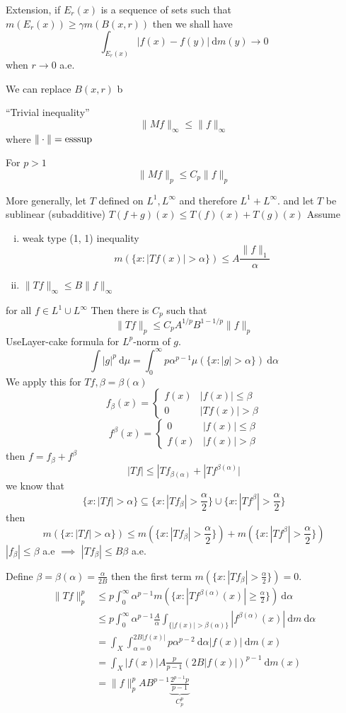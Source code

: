 Extension, if $E_r(x)$ is a sequence of sets such that
$m(E_r(x)) \ge \gamma m(B(x, r))$
then we shall have 
\[\int_{E_r(x)} |f(x) - f(y)| \ \mathrm{d}m(y) \to 0\]
when $r\to 0$ a.e.

We can replace $B(x, r)$ b


``Trivial inequality''
\[\|Mf\|_\infty \le \|f\|_\infty\]
where $\|\cdot\| = \operatorname*{ess sup}$

\begin{theorem}
  For $p > 1$ 
  \[\|Mf\|_p \le C_p \|f\|_p\]
\end{theorem}
More generally, let $T$ defined on $L^1, L^\infty$ and therefore $L^1 + L^\infty$.
and let $T$ be sublinear (subadditive) $T(f + g){(x)} \le T(f)(x) + T(g)(x)$
Assume
\begin{enumerate}[(i)]
  \item weak type (1, 1) inequality
  \[m(\{x : |Tf(x)| > \alpha\}) \le A \frac{\|f\|_1}{\alpha}\]
  \item $\|Tf\|_\infty \le B\|f\|_\infty$
\end{enumerate}
for all $f \in L^1 \cup L^\infty$
Then there is $C_p$ such that 
\[\|Tf\|_p \le C_p A^{1/p} B^{1-1/p}\|f\|_p\]
UseLayer-cake formula for $L^p$-norm of $g$.
\[\int|g|^p \ \mathrm{d}\mu = \int_0^\infty p\alpha^{p-1} \mu(\{x : |g| > \alpha\}) \ \mathrm{d}\alpha\]
We apply this for $Tf, \beta = \beta(\alpha)$
\[f_\beta(x) = \begin{cases}
  f(x) & |f(x)| \le \beta \\
  0 & |Tf(x)| > \beta 
\end{cases}\]
\[f^\beta(x) = \begin{cases}
  0 & |f(x)| \le \beta \\
  f(x) & |f(x)| > \beta
\end{cases}\]
then $f = f_\beta + f^\beta$ 
\[|Tf| \le |Tf_{\beta(\alpha)} + |Tf^{\beta(\alpha)}|\]
we know that
\[\{x : |Tf| > \alpha \} \subseteq \{x : |Tf_\beta| > \frac\alpha2\} \cup\{x : |Tf^\beta| > \frac\alpha2\} \]
then
\[m(\{x : |Tf| > \alpha \}) \le m(\{x : |Tf_\beta| > \frac\alpha2\})+ m(\{x : |Tf^\beta| > \frac\alpha2\})\]
$|f_\beta| \le \beta$ a.e $\implies$ $|Tf_\beta| \le B\beta$ a.e.

Define $\beta = \beta(\alpha) = \frac{\alpha}{2B}$ then the first term $m(\{x : |Tf_\beta| > \frac\alpha2\}) = 0$. 
\begin{align*}
  \|Tf\|_p^p &\le p\int_0^\infty \alpha^{p-1} m(\{x : |Tf^{\beta(\alpha)}(x)| \ge \frac\alpha2\}) \ \mathrm{d}\alpha \\
  &\le p\int_0^\infty \alpha^{p-1} \frac{A}\alpha \int_{\{|f(x)| > \beta(\alpha)\}} |f^{\beta(\alpha)}(x)| \ \mathrm{d}m \ \mathrm{d}\alpha \\
  &= \int_X\int_{\alpha=0}^{2B|f(x)|} p\alpha^{p-2} \ \mathrm{d}\alpha |f(x)| \ \mathrm{d}m(x) \\
  &= \int_X |f(x)| A\frac p{p-1}(2B |f(x)|)^{p-1} \ \mathrm{d}m(x) \\
  &= \|f\|_p^p AB^{p-1} \underbrace{\frac{2^{p-1}p}{p-1}}_{C_p^p}
\end{align*}

